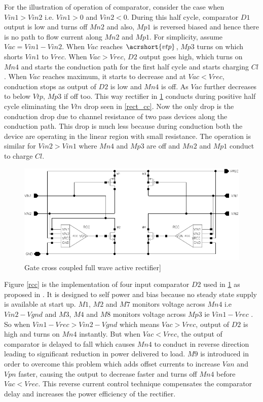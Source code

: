 \documentclass[12pt,a4paper,UKenglish]{report}
\begin{document}
For the illustration of operation of comparator, consider the case when $Vin1 > Vin2$ i.e. $Vin1 > 0$ and $Vin2 < 0$. During this half cycle, comparator $D1$ output is low and turns off $Mn2$ and also, $Mp1$ is reversed biased and hence there is no path to flow current along $Mn2$ and $Mp1$. For simplicity, assume $Vac =  Vin1 - Vin2$. When $Vac$ reaches $\acrshort{vtp}$, $Mp3$ turns on which shorts $Vin1$ to $Vrec$. When $Vac > Vrec$, $D2$ output goes high, which turns on $Mn4$ and starts the conduction path for the first half cycle and starts charging $Cl$. When $Vac$ reaches maximum, it starts to decrease and at $Vac < Vrec$, conduction stops as output of $D2$ is low and $Mn4$ is off. As $Vac$ further decreases to below $Vtp$, $Mp3$ if off too. This way rectifier in \ref{rect_rcc}  conducts during positive half cycle eliminating the $Vtn$ drop seen in \ref{rect_cc}. Now the only drop is the conduction drop due to channel resistance of two pass devices along the conduction path. This drop is much less because during conduction both the device are operating in the linear region with small resistance. The operation is similar for $Vin2 > Vin1$ where $Mn4$ and $Mp3$ are off and $Mn2$ and $Mp1$ conduct to charge $Cl$. \\

\begin{figure}[htbp] %
   \centering
   \includegraphics[width=\textwidth]{img/rectifier_schematic.pdf} 
   \caption{Gate cross coupled full wave active rectifier]}
   \label{rect_rcc}
\end{figure}

Figure \ref{rcc}  is the implementation of four input comparator $D2$ used in \ref{rect_rcc} as proposed in \cite{rectrcc}. It is designed to self power and bias because no steady state supply is available at start up. $M1$, $M2$ and $M7$ monitors voltage across $Mn4$ i.e $Vin2 - Vgnd$ and $M3$, $M4$ and $M8$ monitors voltage across $Mp3$ ie $Vin1 - Vrec$ . So when $Vin1 - Vrec > Vin2 - Vgnd$ which means $Vac > Vrec$, output of $D2$ is high and turns on $Mn4$ instantly. But when $Vac < Vrec$, the output of comparator is delayed to fall which causes $Mn4$ to conduct in reverse direction leading to significant reduction in power delivered to load. $M9$ is introduced in order to overcome this problem which adds offset currents to increase $Van$ and $Vpn$ faster, causing the output to decrease faster and turns off $Mn4$ before $Vac < Vrec$. This reverse current control technique compensates the comparator delay and increases the power efficiency of the rectifier. \\
\end{document}
